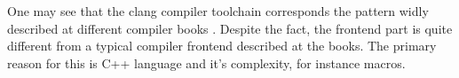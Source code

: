 One may see that the clang compiler toolchain corresponds the pattern
widly described at different compiler books
\cite{book:engineering_a_compiler}. Despite the fact, the frontend
part is quite different from a typical compiler frontend described at
the books. The primary reason for this is C++ language and it's
complexity, for instance macros. 
